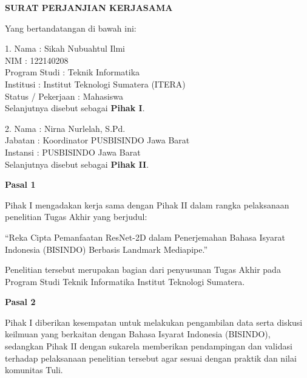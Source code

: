 \newpage
\thispagestyle{empty}

\begin{center}
{\Huge \textbf{SURAT PERJANJIAN KERJASAMA}}
\end{center}

\vspace{2em}

Yang bertandatangan di bawah ini:

\vspace{1em}

1. Nama : Sikah Nubuahtul Ilmi \\
   NIM : 122140208 \\
   Program Studi : Teknik Informatika \\
   Institusi : Institut Teknologi Sumatera (ITERA) \\
   Status / Pekerjaan : Mahasiswa \\

Selanjutnya disebut sebagai \textbf{Pihak I}.

\vspace{1.5em}

2. Nama : Nirna Nurlelah, S.Pd. \\
   Jabatan : Koordinator PUSBISINDO Jawa Barat \\
   Instansi : PUSBISINDO Jawa Barat \\

Selanjutnya disebut sebagai \textbf{Pihak II}.

\vspace{2em}

\textbf{Pasal 1}

Pihak I mengadakan kerja sama dengan Pihak II dalam rangka pelaksanaan penelitian Tugas Akhir yang berjudul:

``Reka Cipta Pemanfaatan ResNet-2D dalam Penerjemahan Bahasa Isyarat Indonesia (BISINDO) Berbasis Landmark Mediapipe.''

Penelitian tersebut merupakan bagian dari penyusunan Tugas Akhir pada Program Studi Teknik Informatika Institut Teknologi Sumatera.

\vspace{1.5em}

\textbf{Pasal 2}

Pihak I diberikan kesempatan untuk melakukan pengambilan data serta diskusi keilmuan yang berkaitan dengan Bahasa Isyarat Indonesia (BISINDO), sedangkan Pihak II dengan sukarela memberikan pendampingan dan validasi terhadap pelaksanaan penelitian tersebut agar sesuai dengan praktik dan nilai komunitas Tuli.


